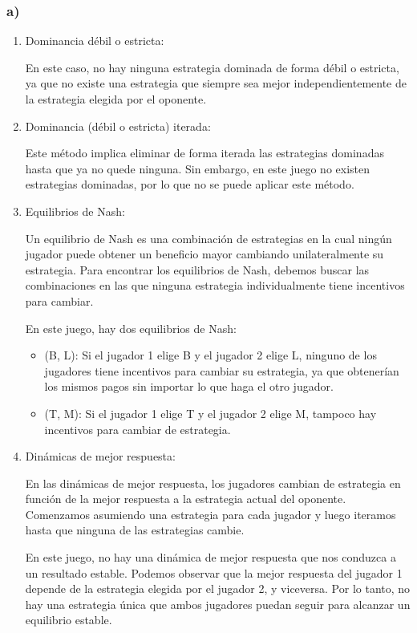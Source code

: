 \documentclass[11pt]{article}
\begin{document}
\subsubsection*{a)}
\begin{enumerate}
    \item Dominancia débil o estricta:
    
    En este caso, no hay ninguna estrategia dominada de forma débil o estricta, ya que no existe una estrategia que siempre sea mejor independientemente de la estrategia elegida por el oponente.
    
    \item Dominancia (débil o estricta) iterada:
    
    Este método implica eliminar de forma iterada las estrategias dominadas hasta que ya no quede ninguna. Sin embargo, en este juego no existen estrategias dominadas, por lo que no se puede aplicar este método.
    
    \item Equilibrios de Nash:
    
    Un equilibrio de Nash es una combinación de estrategias en la cual ningún jugador puede obtener un beneficio mayor cambiando unilateralmente su estrategia. Para encontrar los equilibrios de Nash, debemos buscar las combinaciones en las que ninguna estrategia individualmente tiene incentivos para cambiar.
    
    En este juego, hay dos equilibrios de Nash:
    \begin{itemize}
    \item (B, L): Si el jugador 1 elige B y el jugador 2 elige L, ninguno de los jugadores tiene incentivos para cambiar su estrategia, ya que obtenerían los mismos pagos sin importar lo que haga el otro jugador.
    \item (T, M): Si el jugador 1 elige T y el jugador 2 elige M, tampoco hay incentivos para cambiar de estrategia.
    \end{itemize}
    
    \item Dinámicas de mejor respuesta:
    
    En las dinámicas de mejor respuesta, los jugadores cambian de estrategia en función de la mejor respuesta a la estrategia actual del oponente. Comenzamos asumiendo una estrategia para cada jugador y luego iteramos hasta que ninguna de las estrategias cambie.
    
    En este juego, no hay una dinámica de mejor respuesta que nos conduzca a un resultado estable. Podemos observar que la mejor respuesta del jugador 1 depende de la estrategia elegida por el jugador 2, y viceversa. Por lo tanto, no hay una estrategia única que ambos jugadores puedan seguir para alcanzar un equilibrio estable.
    

\end{enumerate}
\end{document}

